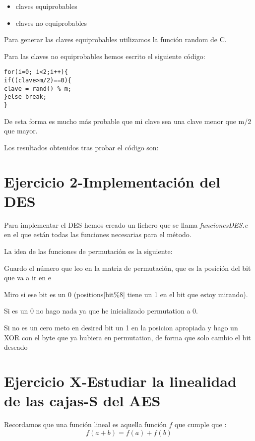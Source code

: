 \documentclass{apuntes}
\begin{document}
\begin{itemize}
	\item claves equiprobables
	\item claves no equiprobables
\end{itemize}

Para generar las claves equiprobables utilizamos la función random de C.

Para las claves no equiprobables hemos escrito el siguiente código:


\begin{lstlisting}
for(i=0; i<2;i++){
if((clave>m/2)==0){
clave = rand() % m;
}else break;
}
\end{lstlisting}



De esta forma es mucho más probable que mi clave sea una clave menor que m/2 que mayor. 


Los resultados obtenidos tras probar el código son:



\section{Ejercicio 2-Implementación del DES}

Para implementar el DES hemos creado un fichero que se llama \textit{funcionesDES.c} en el que están todas las funciones necesarias para el método.

La idea de las funciones de permutación es la siguiente:

Guardo el número que leo en la matriz de permutación, que es la posición del bit que va a ir en e 

Miro si ese bit es un 0 (positions[bit\%8] tiene un 1 en el bit que estoy mirando).

Si es un 0 no hago nada ya que he inicializado permutation a 0.

Si no es un cero meto en desired bit un 1 en la posicion apropiada y hago un 
XOR con el byte que ya hubiera en permutation, de forma que solo cambio el bit deseado


\section{Ejercicio X-Estudiar la linealidad de las cajas-S del AES}

Recordamos que una función lineal es aquella función $f$ que cumple que :
$$f(a + b) = f(a) + f(b)$$
\end{document}
